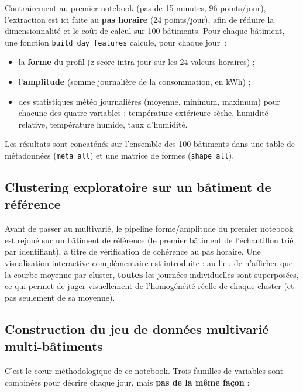 \documentclass[11pt,a4paper]{article}
\newcommand{\code}[1]{\texttt{#1}}
\begin{document}
Contrairement au premier notebook (pas de 15 minutes, 96 points/jour), l'extraction est ici
faite au \textbf{pas horaire} (24 points/jour), afin de réduire la dimensionnalité et le coût de
calcul sur 100 bâtiments. Pour chaque bâtiment, une fonction \code{build\_day\_features}
calcule, pour chaque jour~:

\begin{itemize}
    \item la \textbf{forme} du profil (z-score intra-jour sur les 24 valeurs horaires) ;
    \item l'\textbf{amplitude} (somme journalière de la consommation, en kWh) ;
    \item des statistiques météo journalières (moyenne, minimum, maximum) pour chacune des
    quatre variables : température extérieure sèche, humidité relative, température humide,
    taux d'humidité.
\end{itemize}

Les résultats sont concaténés sur l'ensemble des 100 bâtiments dans une table de métadonnées
(\code{meta\_all}) et une matrice de formes (\code{shape\_all}).

\subsection{Clustering exploratoire sur un bâtiment de référence}

Avant de passer au multivarié, le pipeline forme/amplitude du premier notebook est rejoué sur
un bâtiment de référence (le premier bâtiment de l'échantillon trié par identifiant), à titre
de vérification de cohérence au pas horaire. Une visualisation interactive complémentaire est
introduite : au lieu de n'afficher que la courbe moyenne par cluster, \textbf{toutes} les
journées individuelles sont superposées, ce qui permet de juger visuellement de l'homogénéité
réelle de chaque cluster (et pas seulement de sa moyenne).

\subsection{Construction du jeu de données multivarié multi-bâtiments}

C'est le cœur méthodologique de ce notebook. Trois familles de variables sont combinées pour
décrire chaque jour, mais \textbf{pas de la même façon} :
\end{document}
